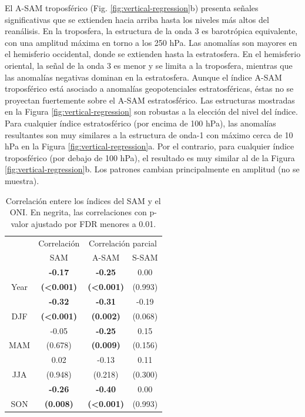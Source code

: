 \documentclass[12pt,oneside,a4paper]{reedthesis}
\begin{document}
El A-SAM troposférico (Fig. \ref{fig:vertical-regression}b) presenta señales significativas que se extienden hacia arriba hasta los niveles más altos del reanálisis.
En la troposfera, la estructura de la onda 3 es barotrópica equivalente, con una amplitud máxima en torno a los 250 hPa.
Las anomalías son mayores en el hemisferio occidental, donde se extienden hasta la estratosfera.
En el hemisferio oriental, la señal de la onda 3 es menor y se limita a la troposfera, mientras que las anomalías negativas dominan en la estratosfera.
Aunque el índice A-SAM troposférico está asociado a anomalías geopotenciales estratosféricas, éstas no se proyectan fuertemente sobre el A-SAM estratosférico.
Las estructuras mostradas en la Figura \ref{fig:vertical-regression} son robustas a la elección del nivel del índice.
Para cualquier índice estratosférico (por encima de 100 hPa), las anomalías resultantes son muy similares a la estructura de onda-1 con máximo cerca de 10 hPa en la Figura \ref{fig:vertical-regression}a.
Por el contrario, para cualquier índice troposférico (por debajo de 100 hPa), el resultado es muy similar al de la Figura \ref{fig:vertical-regression}b.
Los patrones cambian principalmente en amplitud (no se muestra).



\begin{table}

\caption{\label{tab:enso-cor-table}Correlación entere los índices del SAM y el ONI. En negrita, las correlaciones con p-valor ajustado por FDR menores a 0.01.}
\centering
\begin{tabular}[t]{c>{}c>{}c>{}c}
\toprule
\multicolumn{1}{c}{ } & \multicolumn{1}{c}{Correlación} & \multicolumn{2}{c}{Correlación parcial} \\
\cmidrule(l{3pt}r{3pt}){2-2} \cmidrule(l{3pt}r{3pt}){3-4}
 & SAM & A-SAM & S-SAM\\
\midrule
 & \textbf{-0.17} & \textbf{-0.25} & 0.00\\
\cmidrule{2-4}
\multirow[t]{-2}{*}{\centering\arraybackslash Year} & \textbf{(<0.001)} & \textbf{(<0.001)} & (0.993)\\
\cmidrule{1-4}
 & \textbf{-0.32} & \textbf{-0.31} & -0.19\\
\cmidrule{2-4}
\multirow[t]{-2}{*}{\centering\arraybackslash DJF} & \textbf{(<0.001)} & \textbf{(0.002)} & (0.068)\\
\cmidrule{1-4}
 & -0.05 & \textbf{-0.25} & 0.15\\
\cmidrule{2-4}
\multirow[t]{-2}{*}{\centering\arraybackslash MAM} & (0.678) & \textbf{(0.009)} & (0.156)\\
\cmidrule{1-4}
 & 0.02 & -0.13 & 0.11\\
\cmidrule{2-4}
\multirow[t]{-2}{*}{\centering\arraybackslash JJA} & (0.948) & (0.218) & (0.300)\\
\cmidrule{1-4}
 & \textbf{-0.26} & \textbf{-0.40} & 0.00\\
\cmidrule{2-4}
\multirow[t]{-2}{*}{\centering\arraybackslash SON} & \textbf{(0.008)} & \textbf{(<0.001)} & (0.993)\\
\bottomrule
\end{tabular}
\end{table}
\end{document}
